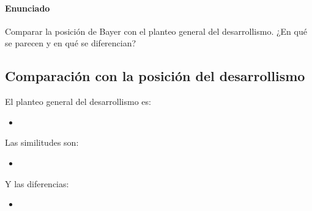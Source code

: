 \paragraph{Enunciado}
 Comparar la posición de Bayer con el planteo general del desarrollismo. ¿En qué se parecen y en qué se diferencian?

 \subsection*{Comparación con la posición del desarrollismo}

 El planteo general del desarrollismo es:

 \begin{itemize}
     \item
 \end{itemize}

 Las similitudes son:

 \begin{itemize}
     \item
 \end{itemize}

 Y las diferencias:

 \begin{itemize}
     \item
 \end{itemize}
